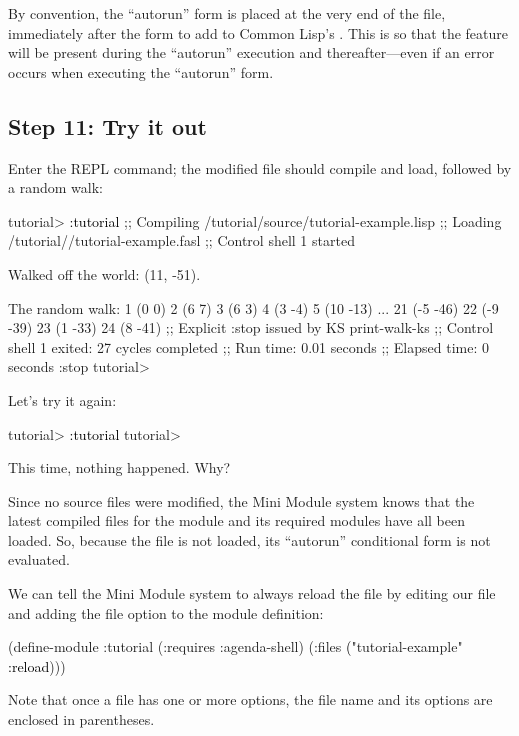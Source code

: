 \documentclass[10pt,twoside,english,pdftex]{article}
\begin{document}
By convention, the ``autorun'' form is placed at the very end of the file,
immediately after the form to add  to Common Lisp's
.  This is so that the  feature will be
present during the ``autorun'' execution and thereafter---even if an error
occurs when executing the ``autorun'' form.

\subsection*{Step 11: Try it out}

Enter the  REPL command; the modified
 file should compile and load, followed by a
random walk:
%
\W\supp
\begin{example}
\textcolor{darkergray}{%
  tutorial> \textcolor{black}{:tutorial}
  ;; Compiling /tutorial/source/tutorial-example.lisp
  ;; Loading /tutorial//tutorial-example.fasl
  ;; Control shell 1 started

  Walked off the world: (11, -51).

  The random walk:
  1 (0 0)
  2 (6 7)
  3 (6 3)
  4 (3 -4)
  5 (10 -13)
     ...
  21 (-5 -46)
  22 (-9 -39)
  23 (1 -33)
  24 (8 -41)
  ;; Explicit :stop issued by KS print-walk-ks
  ;; Control shell 1 exited: 27 cycles completed
  ;; Run time: 0.01 seconds
  ;; Elapsed time: 0 seconds
  :stop
  tutorial>}
\end{example}

Let's try it again:
%
\W\supp
\begin{example}
\textcolor{darkergray}{%
  tutorial> \textcolor{black}{:tutorial}
  tutorial>}
\end{example}
%
This time, nothing happened.  Why?

Since no source files were modified, the Mini Module system knows that the
latest compiled files for the  module and its required modules
have all been loaded.  So, because the  file is not
loaded, its ``autorun'' conditional form is not evaluated.

We can tell the Mini Module system to always reload the
 file by editing our  file and
adding the  file option to the  module
definition:
%
\W\supp
\begin{example}
\textcolor{darkergray}{%
  (define-module :tutorial
    (:requires :agenda-shell)
    (:files \textcolor{black}{(}"tutorial-example" \textcolor{black}{:reload})))}
\end{example}
%
Note that once a file has one or more options, the file name and its options
are enclosed in parentheses.
\end{document}

